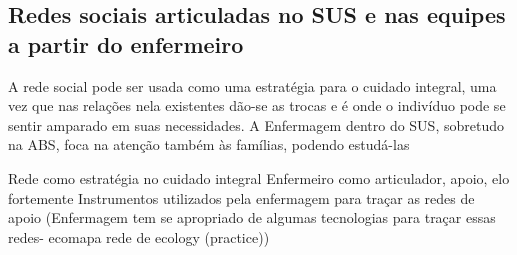 \subsection{Redes sociais articuladas no SUS e nas equipes a partir do enfermeiro}

A rede social pode ser usada como uma estratégia para o cuidado integral, uma vez que nas relações nela existentes dão-se as trocas e é onde o indivíduo pode se sentir amparado em suas necessidades. A Enfermagem dentro do SUS, sobretudo na ABS, foca na atenção também às famílias, podendo estudá-las 

Rede como estratégia no cuidado integral
Enfermeiro como articulador, apoio, elo fortemente
Instrumentos utilizados pela enfermagem para traçar as redes de apoio
(Enfermagem tem se apropriado de algumas tecnologias para traçar essas redes- ecomapa
rede de ecology (practice))
